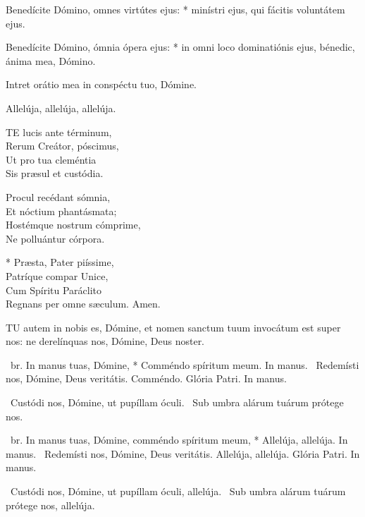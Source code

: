 Benedícite Dómino, omnes virtútes ejus: * minístri ejus, qui fácitis voluntátem ejus.

Benedícite Dómino, ómnia ópera ejus: * in omni loco dominatiónis ejus, bénedic, ánima mea, Dómino.


 Intret orátio mea in conspéctu tuo, Dómine.


 Allelúja, allelúja, allelúja.


\lettrine[lines=2]{T}{E} lucis ante términum,\\
Rerum Creátor, póscimus,\\
Ut pro tua cleméntia\\
Sis præsul et custódia.

Procul recédant sómnia,\\
Et nóctium phantásmata;\\
Hostémque nostrum cómprime,\\
Ne polluántur córpora.

* Præsta, Pater piíssime,\\
Patríque compar Unice,\\
Cum Spíritu Paráclito\\
Regnans per omne sæculum. Amen.


\lettrine[lines=2]{T}{U} autem in nobis es, Dómine, et nomen sanctum tuum invocátum est super nos: ne derelínquas nos, Dómine, Deus noster.

\R\ br. In manus tuas, Dómine, * Comméndo spíritum meum. In manus. \V\ Redemísti nos, Dómine, Deus veritátis. Comméndo. Glória Patri. In manus.

\V\ Custódi nos, Dómine, ut pupíllam óculi. \R\ Sub umbra alárum tuárum prótege nos.



\R\ br. In manus tuas, Dómine, comméndo spíritum meum, * Allelúja, allelúja. In manus. \V\ Redemísti nos, Dómine, Deus veritátis. Allelúja, allelúja. Glória Patri. In manus.

\V\ Custódi nos, Dómine, ut pupíllam óculi, allelúja. \R\ Sub umbra alárum tuárum prótege nos, allelúja.

